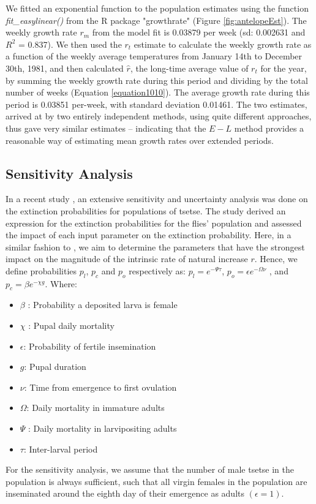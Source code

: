\documentclass[12pt,a4paper]{article}
\begin{document}
\newpage
We fitted an exponential function to the population estimates using the function \textit{fit\_easylinear()} from the R package "growthrate" (Figure \ref{fig:antelopeEst}). The weekly growth rate $r_m$ from the model fit is 0.03879 per week (sd: 0.002631 and $R^2$ = 0.837). We then used the $r_t$ estimate to calculate the weekly growth rate as a function of the weekly average temperatures from January 14th to December 30th, 1981, and then calculated $\hat{r}$, the long-time average value of $r_t$ for the year, by summing the weekly growth rate during this period and dividing by the total number of weeks (Equation \ref{equation1010}). The average growth rate during this period is 0.03851 per-week, with standard deviation 0.01461. The two estimates, arrived at by two entirely independent methods, using quite different approaches, thus gave very similar estimates – indicating that the $E-L$ method provides a reasonable way of estimating mean  growth rates over extended periods.


\subsection*{Sensitivity Analysis}
In a recent study \cite{are2019weakest}, an extensive sensitivity and uncertainty analysis was done on the extinction probabilities for populations of tsetse. The study derived an expression for the extinction probabilities for the flies' population and assessed the impact of each input parameter on the extinction probability. Here, in  a similar fashion to \cite{are2019weakest}, we aim to determine the parameters that have the strongest impact on the magnitude of the intrinsic rate of natural increase $r$. Hence, we define probabilities $p_l$, $p_c$ and $p_o$ respectively as: $p_l=e^{-\Psi \tau} $, $p_o =\epsilon e^{-\Omega \nu}$ , and $p_c =\beta e^{-\chi g}$.  Where: 
\begin{itemize}
	\item $\beta$ : Probability a deposited larva is female
	\item $\chi$ : Pupal daily mortality
	\item $\epsilon$: Probability of fertile insemination
	\item $g$: Pupal duration
	\item $\nu$: Time from emergence to first ovulation 
	\item $\Omega$: Daily mortality in immature adults 
	\item $\Psi$ : Daily mortality in larvipositing adults 
	\item $\tau$: Inter-larval period
\end{itemize}
For the sensitivity analysis, we assume that the number of male tsetse  in the population is always sufficient, such that all virgin females in the population are inseminated around the eighth  day of their emergence as adults $(\epsilon = 1)$. 
\end{document}
